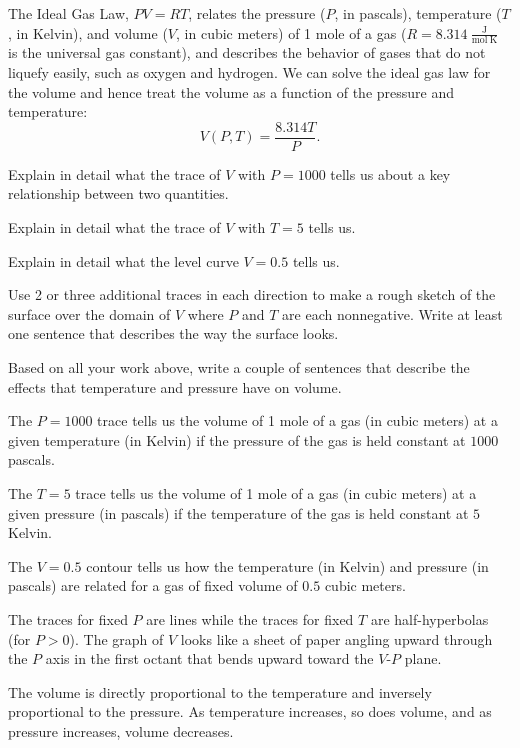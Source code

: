 \begin{exercises}
\begin{exerciseSolution}
  \ea 
\end{exerciseSolution}


\item \label{Ez:9.1.2}   The Ideal Gas Law, $PV = RT$, relates the pressure ($P$, in pascals), temperature ($T$, in Kelvin), and volume ($V$, in cubic meters) of 1 mole of a gas ($R =  8.314 \ \frac{\text{J}}{\text{mol} \ \text{K}}$ is the universal gas constant), and describes the behavior of gases that do not liquefy easily, such as oxygen and hydrogen. We can solve the ideal gas law for the volume and hence treat the volume as a function of the pressure and temperature:
\[V(P,T) = \frac{8.314T}{P}.\]
    \ba
    \item Explain in detail what the trace of $V$ with $P=1000$ tells us about a key relationship between two quantities.
    \item Explain in detail what the trace of $V$ with $T=5$ tells us.
    \item Explain in detail what the level curve $V = 0.5$ tells us.
    \item Use 2 or three additional traces in each direction to make a rough sketch of the surface over the domain of $V$ where $P$ and $T$ are each nonnegative.  Write at least one sentence that describes the way the surface looks.
    \item Based on all your work above, write a couple of sentences that describe the effects that temperature and pressure have on volume.
    \ea
    
\begin{exerciseSolution}
    \ba
    \item The $P=1000$ trace tells us the volume of 1 mole of a gas (in cubic meters) at a given temperature (in Kelvin) if the pressure of the gas is held constant at $1000$ pascals.
    \item The $T=5$ trace tells us the volume of 1 mole of a gas (in cubic meters) at a given pressure (in pascals) if the temperature of the gas is held constant at $5$ Kelvin.
    \item The $V = 0.5$ contour tells us how the temperature (in Kelvin) and pressure (in pascals) are related for a gas of fixed volume of $0.5$ cubic meters. 
    \item The traces for fixed $P$ are lines while the traces for fixed $T$ are half-hyperbolas (for $P > 0$). The graph of $V$ looks like a sheet of paper angling upward through the $P$ axis in the first octant that bends upward toward the $V$-$P$ plane. 
    \item The volume is directly proportional to the temperature and inversely proportional to the pressure. As temperature increases, so does volume, and as pressure increases, volume decreases. 
    \ea
\end{exerciseSolution}
    

\end{exercises}
